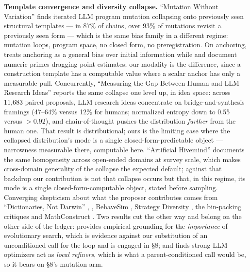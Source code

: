 \textbf{Template convergence and diversity collapse.} ``Mutation Without Variation'' \citep{gurkan2026mutationvariationconvergencedynamics}
finds iterated LLM program mutation collapsing onto previously
seen structural templates --- in 87\% of chains, over 93\% of mutations revisit a previously seen
form --- which is the same bias family in a different regime: mutation loops, program space, no
closed form, no preregistration. On anchoring, \citet{huang2026understandinganchoringeffectllm} treats anchoring as a general bias
over initial information while \citet{lou2024anchoringbiaslargelanguage} and \citet{malberg2025comprehensiveevaluationcognitivebiases} document numeric primes dragging point
estimates; our modality is the difference, since a construction template has a computable value
where a scalar anchor has only a measurable pull. Concurrently, ``Measuring the Gap Between
Human and LLM Research Ideas'' \citep{chen2026measuringgaphumanllm} reports the same collapse one level up, in idea
space: across 11,683 paired proposals, LLM research ideas concentrate on bridge-and-synthesis
framings (47--64\% versus 12\% for humans; normalized entropy down to 0.55 versus $>$0.92), and
chain-of-thought pushes the distribution \emph{further} from the human one. That result is
distributional; ours is the limiting case where the collapsed distribution's mode is a single
closed-form-predictable object --- narrowness measurable there, computable here. ``Artificial
Hivemind'' \citep{jiang2025artificialhivemindopenendedhomogeneity} documents the same homogeneity across open-ended domains at survey
scale, which makes cross-domain generality of the collapse the expected default; against that
backdrop our contribution is not that collapse occurs but that, in this regime, its mode is a
single closed-form-computable object, stated before sampling. Converging
skepticism about what the proposer contributes comes from ``Dictionaries, Not Darwin'' \citep{li2026dictionariesdarwinsetlevelselection}, \citet{wang2026diversescientifichypothesissearch}, BehaveSim
\citep{zhang2026rethinkingcodesimilarityautomated}, Strategy Diversity \citep{yang2026accuracyevaluatingstrategydiversity}, the bin-packing critiques \citep{herrmann2026indepthstudyllmcontributions,sim2025hypebenchmarkingllmevolvedheuristics} and MathConstruct \citep{balunovic2025mathconstructchallengingllmreasoning}. Two results cut the other way and belong on the
other side of the ledger: \citet{zhang2024understandingimportanceevolutionarysearch} provides empirical grounding for the
\emph{importance} of evolutionary search, which is evidence against our substitution of an
unconditioned call for the loop and is engaged in \S8; and \citet{zhang2026makesllmgoodoptimizer} finds strong LLM optimizers
act as \emph{local refiners}, which is what a parent-conditioned call would be, so it bears on \S8's
mutation arm.

